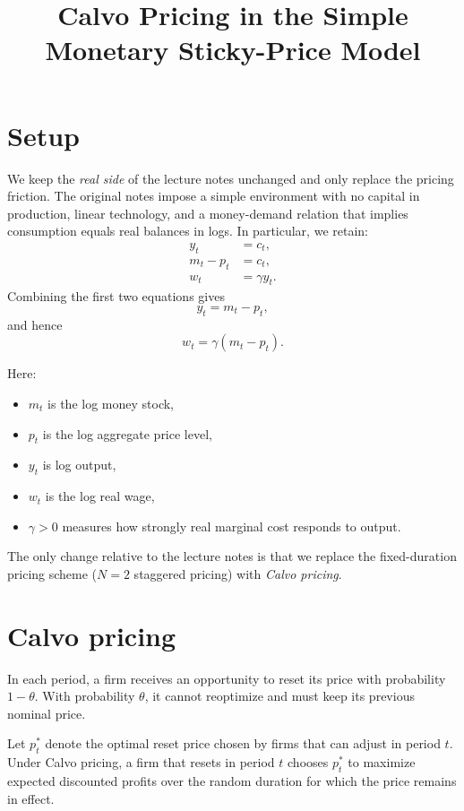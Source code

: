 \documentclass[11pt]{article}
\title{Calvo Pricing in the Simple Monetary Sticky-Price Model}
\author{}
\date{}
\begin{document}
\maketitle


\section{Setup}

We keep the \emph{real side} of the lecture notes unchanged and only replace the pricing friction.
The original notes impose a simple environment with no capital in production, linear technology,
and a money-demand relation that implies consumption equals real balances in logs. In particular,
we retain:
\begin{align}
y_t &= c_t, \\
m_t - p_t &= c_t, \\
w_t &= \gamma y_t.
\end{align}
Combining the first two equations gives
\begin{equation}
y_t = m_t - p_t,
\end{equation}
and hence
\begin{equation}
w_t = \gamma (m_t - p_t).
\end{equation}

Here:
\begin{itemize}
    \item $m_t$ is the log money stock,
    \item $p_t$ is the log aggregate price level,
    \item $y_t$ is log output,
    \item $w_t$ is the log real wage,
    \item $\gamma>0$ measures how strongly real marginal cost responds to output.
\end{itemize}

The only change relative to the lecture notes is that we replace the fixed-duration pricing scheme
($N=2$ staggered pricing) with \emph{Calvo pricing}.

\section{Calvo pricing}

In each period, a firm receives an opportunity to reset its price with probability $1-\theta$.
With probability $\theta$, it cannot reoptimize and must keep its previous nominal price.

Let $p_t^*$ denote the optimal reset price chosen by firms that can adjust in period $t$.
Under Calvo pricing, a firm that resets in period $t$ chooses $p_t^*$ to maximize expected discounted
profits over the random duration for which the price remains in effect.
\end{document}
